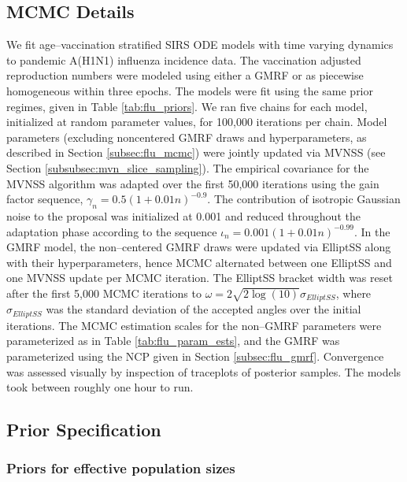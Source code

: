 \subsection{MCMC Details}
\label{subsec:flu_mcmc_details}
We fit age--vaccination stratified SIRS ODE models with time varying dynamics to pandemic A(H1N1) influenza incidence data. The vaccination adjusted reproduction numbers were modeled using either a GMRF or as piecewise homogeneous within three epochs. The models were fit using the same prior regimes, given in Table \ref{tab:flu_priors}. We ran five chains for each model, initialized at random parameter values, for 100,000 iterations per chain. Model parameters (excluding noncentered GMRF draws and hyperparameters, as described in Section \ref{subsec:flu_mcmc}) were jointly updated via MVNSS (see Section \ref{subsubsec:mvn_slice_sampling}). The empirical covariance for the MVNSS algorithm was adapted over the first 50,000 iterations using the gain factor sequence, $\gamma_n = 0.5(1 + 0.01n)^{-0.9}$. The contribution of isotropic Gaussian noise to the proposal was initialized at 0.001 and reduced throughout the adaptation phase according to the sequence $ \iota_n = 0.001(1 + 0.01n)^{-0.99} $. In the GMRF model, the non--centered GMRF draws were updated via ElliptSS along with their hyperparameters, hence MCMC alternated between one ElliptSS and one MVNSS update per MCMC iteration. The ElliptSS bracket width was reset after the first 5,000 MCMC iterations to $ \omega = 2\sqrt{2\log(10)}\sigma_{ElliptSS}$, where $ \sigma_{ElliptSS} $ was the standard deviation of the accepted angles over the initial iterations. The MCMC estimation scales for the non--GMRF parameters were parameterized as in Table \ref{tab:flu_param_ests}, and the GMRF was parameterized using the NCP given in Section \ref{subsec:flu_gmrf}. Convergence was assessed visually by inspection of traceplots of posterior samples. The models took between roughly one hour to run.

\newpage
\subsection{Prior Specification}
\label{subsec:flu_priors}

\subsubsection{Priors for effective population sizes}
\label{subsubsec:flu_effpop_priors}

